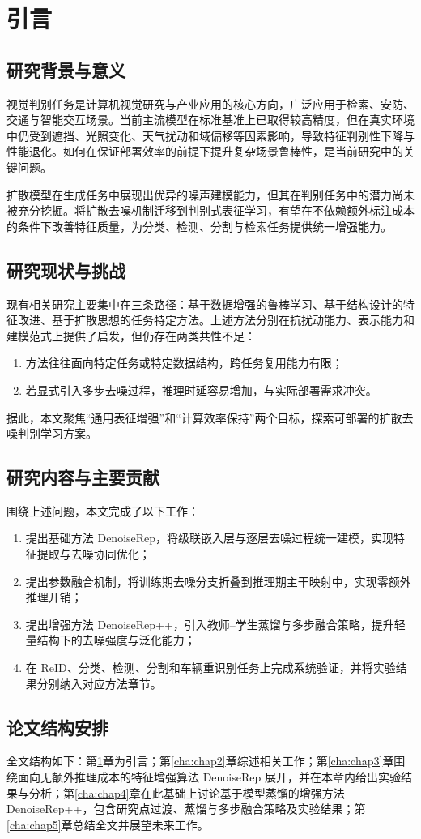 ﻿\setlength{\baselineskip}{20pt}
\chapter{引言}
\label{cha:intro}

\section{研究背景与意义}
视觉判别任务是计算机视觉研究与产业应用的核心方向，广泛应用于检索、安防、交通与智能交互场景。当前主流模型在标准基准上已取得较高精度，但在真实环境中仍受到遮挡、光照变化、天气扰动和域偏移等因素影响，导致特征判别性下降与性能退化。如何在保证部署效率的前提下提升复杂场景鲁棒性，是当前研究中的关键问题。

扩散模型在生成任务中展现出优异的噪声建模能力，但其在判别任务中的潜力尚未被充分挖掘。将扩散去噪机制迁移到判别式表征学习，有望在不依赖额外标注成本的条件下改善特征质量，为分类、检测、分割与检索任务提供统一增强能力。

\section{研究现状与挑战}
现有相关研究主要集中在三条路径：基于数据增强的鲁棒学习、基于结构设计的特征改进、基于扩散思想的任务特定方法。上述方法分别在抗扰动能力、表示能力和建模范式上提供了启发，但仍存在两类共性不足：
\begin{enumerate}
  \item 方法往往面向特定任务或特定数据结构，跨任务复用能力有限；
  \item 若显式引入多步去噪过程，推理时延容易增加，与实际部署需求冲突。
\end{enumerate}

据此，本文聚焦“通用表征增强”和“计算效率保持”两个目标，探索可部署的扩散去噪判别学习方案。

\section{研究内容与主要贡献}
围绕上述问题，本文完成了以下工作：
\begin{enumerate}
  \item 提出基础方法 DenoiseRep，将级联嵌入层与逐层去噪过程统一建模，实现特征提取与去噪协同优化；
  \item 提出参数融合机制，将训练期去噪分支折叠到推理期主干映射中，实现零额外推理开销；
  \item 提出增强方法 DenoiseRep++，引入教师--学生蒸馏与多步融合策略，提升轻量结构下的去噪强度与泛化能力；
  \item 在 ReID、分类、检测、分割和车辆重识别任务上完成系统验证，并将实验结果分别纳入对应方法章节。
\end{enumerate}

\section{论文结构安排}
全文结构如下：第\ref{cha:intro}章为引言；第\ref{cha:chap2}章综述相关工作；第\ref{cha:chap3}章围绕面向无额外推理成本的特征增强算法 DenoiseRep 展开，并在本章内给出实验结果与分析；第\ref{cha:chap4}章在此基础上讨论基于模型蒸馏的增强方法 DenoiseRep++，包含研究点过渡、蒸馏与多步融合策略及实验结果；第\ref{cha:chap5}章总结全文并展望未来工作。
